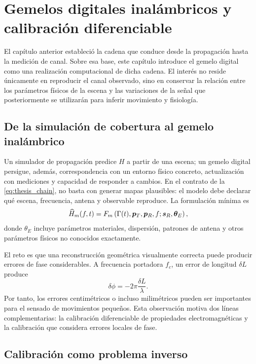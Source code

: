 \chapter{Gemelos digitales inalámbricos y calibración diferenciable}
\label{ch:wdt}

El capítulo anterior estableció la cadena que conduce desde la propagación hasta la
medición de canal. Sobre esa base, este capítulo introduce el gemelo digital como una
realización computacional de dicha cadena. El interés no reside únicamente en reproducir
el canal observado, sino en conservar la relación entre los parámetros físicos de la escena
y las variaciones de la señal que posteriormente se utilizarán para inferir movimiento y
fisiología.

\section{De la simulación de cobertura al gemelo inalámbrico}

Un simulador de propagación predice $H$ a partir de una escena; un gemelo digital persigue, además, correspondencia con un entorno físico concreto, actualización con mediciones y capacidad de responder a cambios. En el contrato de la \cref{eq:thesis_chain}, no basta con generar mapas plausibles: el modelo debe declarar qué escena, frecuencia, antena y observable reproduce. La formulación mínima es
\begin{equation}
\widehat H_m(f,t)=F_m
\left(\Gamma(t),\bm{p}_T,\bm{p}_R,f;
\bm{s}_R,\bm{\theta}_E\right),
\end{equation}
donde $\theta_E$ incluye parámetros materiales, dispersión, patrones de antena y otros parámetros físicos no conocidos exactamente.

El reto es que una reconstrucción geométrica visualmente correcta puede producir errores de fase considerables. A frecuencia portadora $f_c$, un error de longitud $\delta L$ produce
\begin{equation}
\delta\phi=-2\pi\frac{\delta L}{\lambda}.
\end{equation}
Por tanto, los errores centimétricos o incluso milimétricos pueden ser importantes para el sensado de movimientos pequeños. Esta observación motiva dos líneas complementarias: la calibración diferenciable de propiedades electromagnéticas y la calibración que considera errores locales de fase.

\section{Calibración como problema inverso}

